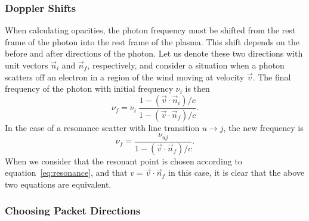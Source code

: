\subsubsection{Doppler Shifts}

When calculating opacities, the photon frequency must be shifted from
the rest frame of the photon into the rest frame of the plasma.
This shift depends on the before and after directions of the photon. Let us denote
these two directions with unit vectors $\vec{n}_i$ and $\vec{n}_f$, respectively,
and consider a situation when a photon scatters off an electron in a region of the
wind moving at velocity $\vec{v}$.
The final frequency of the photon with initial frequency $\nu_i$ is then 
\begin{equation}
\nu_f = \nu_i ~\frac{1 - (\vec{v} \cdot \vec{n}_i) / c}{1 - (\vec{v} \cdot \vec{n}_f) / c}.
\end{equation}
In the case of a resonance scatter with line transition $u \rightarrow j$, the 
new frequency is
\begin{equation}
\nu_f = \frac{\nu_{uj}}{1 - (\vec{v} \cdot \vec{n}_f) / c}.
\end{equation}
When we consider that the resonant point is chosen according to 
equation~\ref{eq:resonance}, and that $v=\vec{v} \cdot \vec{n}_f$ in this case,
it is clear that the above two equations are equivalent.


\subsubsection{Choosing Packet Directions}

